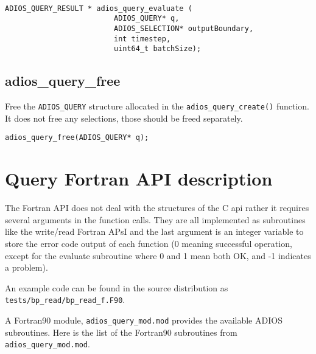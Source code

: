 \begin{lstlisting}[alsolanguage=C]

ADIOS_QUERY_RESULT * adios_query_evaluate (
                         ADIOS_QUERY* q,
                         ADIOS_SELECTION* outputBoundary,
                         int timestep,
                         uint64_t batchSize);
\end{lstlisting}

\subsection{adios\_query\_free}
Free the \verb+ADIOS_QUERY+ structure allocated in the \verb+adios_query_create()+ function. It does not free any selections, those should be freed separately.

\begin{lstlisting}[alsolanguage=C]
adios_query_free(ADIOS_QUERY* q);
\end{lstlisting}

%
%
\section{Query Fortran API description}
\label{section:query_fortran_api}

The Fortran API does not deal with the structures of the C api rather it requires 
several arguments in the function calls.  They are all implemented as subroutines 
like the write/read Fortran APsI and the last argument is an integer variable to store 
the error code output of each function (0 meaning successful operation,  except 
for the evaluate subroutine where 0 and 1 mean both OK, and -1 indicates a problem).

{\color{red}An example code can be found in the source distribution as 
\verb+tests/bp_read/bp_read_f.F90+.}

A Fortran90 module, \verb+adios_query_mod.mod+ provides the available ADIOS subroutines. 
Here is the list of the Fortran90 subroutines from \verb+adios_query_mod.mod+. 


